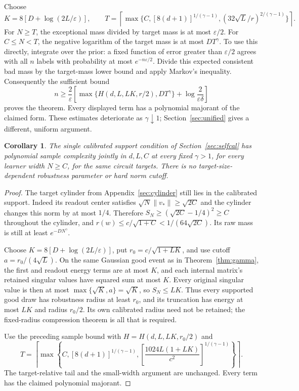 \documentclass[11pt]{article}
\newtheorem{corollary}[theorem]{Corollary}
\begin{document}
Choose
\[
 K=8[D+\log(2L/\varepsilon)],\qquad
 T=\left\lceil\max\{C,[8(d+1)]^{1/(\gamma-1)},
 (32\sqrt L/r)^{2/(\gamma-1)}\}\right\rceil.
\]
For $N\ge T$, the exceptional mass divided by target mass is at most
$\varepsilon/2$. For $C\le N<T$, the negative logarithm of the target mass is
at most $DT^\gamma$. To use this directly, integrate over the prior:
a fixed function of error greater than $\varepsilon/2$ agrees with all
$n$ labels with probability at most $e^{-n\varepsilon/2}$.
Divide this expected consistent bad mass by the target-mass lower
bound and apply Markov's inequality. Consequently the sufficient bound
\[
 n\ge\frac2\varepsilon\left[
 \max\{H(d,L,LK,r/2),DT^\gamma\}
 +\log\frac{2}{\varepsilon\delta}\right]
\]
proves the theorem. Every displayed term has a polynomial majorant of the
claimed form. These estimates deteriorate as $\gamma\downarrow1$;
Section~\ref{sec:unified} gives a different, uniform argument.

\begin{corollary}\label{cor:singleprior}
The single calibrated support condition of Section~\ref{sec:selfcal}
has polynomial sample complexity jointly in $d,L,C$ at every fixed
$\gamma>1$, for every learner width $N\ge C$, for the same circuit targets.
There is no target-size-dependent robustness parameter or hard norm cutoff.
\end{corollary}

\begin{proof}
The target cylinder from Appendix~\ref{sec:cylinder} still lies in the
calibrated support. Indeed its readout center satisfies
$\sqrt N\|v_*\|\ge\sqrt{2C}$ and the cylinder changes this norm by at most
$1/4$. Therefore $S_N\ge(\sqrt{2C}-1/4)^2\ge C$ throughout the cylinder,
and $r(w)\le c/\sqrt{1+C}<1/(64\sqrt{2C})$. Its raw mass is still
at least $e^{-DN^\gamma}$.

Choose $K=8[D+\log(2L/\varepsilon)]$, put
$r_0=c/\sqrt{1+LK}$, and use cutoff $a=r_0/(4\sqrt L)$.
On the same Gaussian good event as in Theorem~\ref{thm:gamma}, the first
and readout energy terms are at most $K$, and each internal matrix's
retained singular values have squared sum at most $K$.
Every original singular value is then at most $\max\{\sqrt K,a\}=\sqrt K$,
so $S_N\le LK$. Thus every supported good draw has robustness radius
at least $r_0$, and its truncation has energy at most $LK$ and radius
$r_0/2$. Its own calibrated radius need not be retained; the fixed-radius
compression theorem is all that is required.

Use the preceding sample bound with $H=H(d,L,LK,r_0/2)$ and
\[
 T=\left\lceil\max\left\{C,[8(d+1)]^{1/(\gamma-1)},
 \left[\frac{1024L(1+LK)}{c^2}\right]^{1/(\gamma-1)}\right\}\right\rceil.
\]
The target-relative tail and the small-width argument are unchanged.
Every term has the claimed polynomial majorant.
\end{proof}
\end{document}
